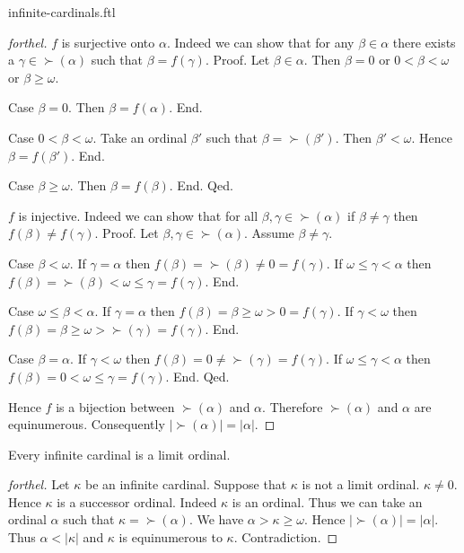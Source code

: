 \documentclass{naproche-library}
\begin{document}
\begin{smodule}{infinite-cardinals.ftl}
\begin{proof}[forthel]
    $f$ is surjective onto $\alpha$.
    Indeed we can show that for any $\beta \in \alpha$ there exists a
    $\gamma \in \succ(\alpha)$ such that $\beta = f(\gamma)$. \newline
    Proof.
      Let $\beta \in \alpha$.
      Then $\beta = 0$ or $0 < \beta < \omega$ or $\beta \geq \omega$.

      Case $\beta = 0$.
        Then $\beta = f(\alpha)$.
      End.

      Case $0 < \beta < \omega$.
        Take an ordinal $\beta'$ such that $\beta = \succ(\beta')$.
        Then $\beta' < \omega$.
        Hence $\beta = f(\beta')$.
      End.

      Case $\beta \geq \omega$.
        Then $\beta = f(\beta)$.
      End.
    Qed.

    $f$ is injective.
    Indeed we can show that for all $\beta, \gamma \in \succ(\alpha)$ if
    $\beta \neq \gamma$ then $f(\beta) \neq f(\gamma)$. \newline
    Proof.
      Let $\beta, \gamma \in \succ(\alpha)$.
      Assume $\beta \neq \gamma$.

      Case $\beta < \omega$.
        If $\gamma = \alpha$ then
        $f(\beta)
          = \succ(\beta)
          \neq 0
          = f(\gamma)$.
        If $\omega \leq \gamma < \alpha$ then
        $f(\beta)
          = \succ(\beta)
          < \omega
          \leq \gamma
          = f(\gamma)$.
      End.

      Case $\omega \leq \beta < \alpha$.
        If $\gamma = \alpha$ then
        $f(\beta)
          = \beta
          \geq \omega
          > 0
          = f(\gamma)$.
        If $\gamma < \omega$ then
        $f(\beta)
          = \beta
          \geq \omega
          > \succ(\gamma)
          = f(\gamma)$.
      End.

      Case $\beta = \alpha$.
        If $\gamma < \omega$ then
        $f(\beta)
          = 0
          \neq \succ(\gamma)
          = f(\gamma)$.
        If $\omega \leq \gamma < \alpha$ then
        $f(\beta)
          = 0
          < \omega
          \leq \gamma
          = f(\gamma)$.
      End.
    Qed.

    Hence $f$ is a bijection between $\succ(\alpha)$ and $\alpha$.
    Therefore $\succ(\alpha)$ and $\alpha$ are equinumerous.
    Consequently $|\succ(\alpha)| = |\alpha|$.
  \end{proof}

  \begin{proposition}[forthel,id=SET_THEORY_07_8700732632989696]
    Every infinite cardinal is a limit ordinal.
  \end{proposition}
  \begin{proof}[forthel]
    Let $\kappa$ be an infinite cardinal.
    Suppose that $\kappa$ is not a limit ordinal.
    $\kappa \neq 0$.
    Hence $\kappa$ is a successor ordinal.
    Indeed $\kappa$ is an ordinal.
    Thus we can take an ordinal $\alpha$ such that $\kappa = \succ(\alpha)$.
    We have $\alpha > \kappa \geq \omega$.
    Hence $|\succ(\alpha)| = |\alpha|$.
    Thus $\alpha < |\kappa|$ and $\kappa$ is equinumerous to $\kappa$.
    Contradiction.
  \end{proof}
\end{smodule}
\end{document}
